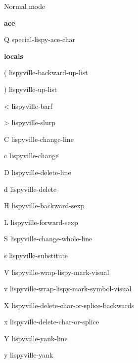 \documentclass[a4paper,10pt]{article}
\renewcommand\section[1]{\bigskip\par\textbf{\large#1}\medskip}
\newcommand\keyify[1]{\keys{\ttfamily#1}}
\begin{document}
\newpage



\begin{center}
  \Huge
  Normal mode
  \par\smallskip
\end{center}

\begin{multicols*}{3}

\section{ace}
\begin{keylist}[labelwidth=\widthof{\keyify{Q}}]
	\item[Q] special-lispy-ace-char
\end{keylist}


\section{locals}
\begin{keylist}[labelwidth=\widthof{\keyify{(}}]
	\item[(] lispyville-backward-up-list
	\item[)] lispyville-up-list
	\item[<] lispyville-barf
	\item[>] lispyville-slurp
	\item[C] lispyville-change-line
	\item[c] lispyville-change
	\item[D] lispyville-delete-line
	\item[d] lispyville-delete
	\item[H] lispyville-backward-sexp
	\item[L] lispyville-forward-sexp
	\item[S] lispyville-change-whole-line
	\item[s] lispyville-substitute
	\item[V] lispyville-wrap-lispy-mark-visual
	\item[v] lispyville-wrap-lispy-mark-symbol-visual
	\item[X] lispyville-delete-char-or-splice-backwards
	\item[x] lispyville-delete-char-or-splice
	\item[Y] lispyville-yank-line
	\item[y] lispyville-yank
\end{keylist}



\end{multicols*}
\end{document}
